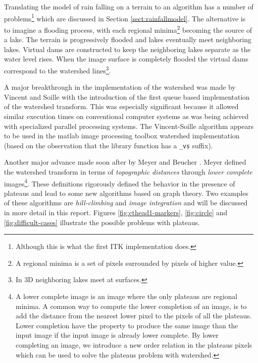 \documentclass{InsightArticle}
\begin{document}
Translating the model of rain falling on a terrain to an algorithm has
a number of problems\footnote{Although this is what the first ITK
implementation does.} which are discussed in Section
\ref{sect:rainfallmodel}. The alternative is to imagine a flooding
process, with each regional minima\footnote{A regional minima is a set
of pixels surrounded by pixels of higher value.} becoming the source
of a lake. The terrain is progressively flooded and lakes eventually
meet neighboring lakes. Virtual dams are constructed to keep the
neighboring lakes separate as the water level rises. When the image
surface is completely flooded the virtual dams correspond to the
watershed lines\footnote{In 3D neighboring lakes meet at surfaces.}.

A major breakthrough in the implementation of the watershed was made
by Vincent and Soille \cite{Vincent91a} with the introduction of the
first queue based implementation of the watershed transform. This was
especially significant because it allowed similar execution times on
conventional computer systems as was being achieved with specialized
parallel processing systems. The Vincent-Soille algorithm appears to
be used in the matlab image processing toolbox watershed
implementation (based on the observation that the library function has
a {\tt \_vs} suffix).

Another major advance made soon after by Meyer and Beucher
\cite{Beucher93a,Meyer1994a}. Meyer defined the watershed transform in terms of {\em
topographic distances} through {\em lower complete} images\footnote{A
lower complete image is an image where the only plateaus are regional
minima. A common way to compute the lower completion of an image, is
to add the distance from the nearest lower pixel to the pixels of all
the plateaus. Lower completion have the property to produce the same
image than the input image if the input image is already lower
complete. By lower completing an image, we introduce a new order
relation in the plateaus pixels which can be used to solve the
plateaus problem with watershed.}. These definitions rigorously
defined the behavior in the presence of plateaus and lead to some new
algorithms based on graph theory. Two examples of these algorithms are
{\em hill-climbing} and {\em image integration} and will be discussed
in more detail in this report.  Figures \ref{fig:cthead1-markers},
\ref{fig:circle} and \ref{fig:difficult-cases} illustrate the possible
problems with plateaus.
\end{document}
